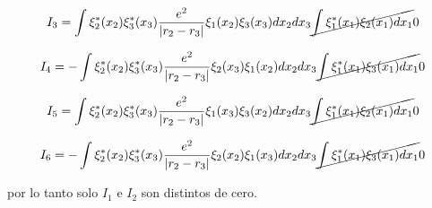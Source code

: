 \documentclass[12pt,a4paper]{article}
\begin{document}
\begin{enumerate}
\begin{enumerate}
    
    
    \begin{equation*}
        I_3=\int \xi_{2}^{*}(x_2) \xi_{3}^{*}(x_3)\frac{e^2}{|r_2 -r_3|} \xi_1(x_2) \xi_3 (x_3)  dx_2 dx_3\cancel{ \int \xi_{1}^{*}(x_1)\xi_2 (x_1) dx_1}0
    \end{equation*}
    
    
    \begin{equation*}
        I_4=-\int \xi_{2}^{*}(x_2) \xi_{3}^{*}(x_3)\frac{e^2}{|r_2 -r_3|} \xi_2(x_3) \xi_1 (x_2)  dx_2 dx_3 \cancel{\int \xi_{1}^{*}(x_1)\xi_3 (x_1) dx_1}0
    \end{equation*}
    
    
    
    \begin{equation*}
        I_5=\int \xi_{2}^{*}(x_2) \xi_{3}^{*}(x_3)\frac{e^2}{|r_2 -r_3|} \xi_1(x_3) \xi_3 (x_2)  dx_2 dx_3 \cancel{\int \xi_{1}^{*}(x_1)\xi_2 (x_1) dx_1}0
    \end{equation*}
    
    
    \begin{equation*}
        I_6 =-\int \xi_{2}^{*}(x_2) \xi_{3}^{*}(x_3)\frac{e^2}{|r_2 -r_3|} \xi_2(x_2) \xi_1 (x_3)  dx_2 dx_3 \cancel{\int \xi_{1}^{*}(x_1)\xi_3 (x_1) dx_1}0
    \end{equation*}
    
    por lo tanto solo $I_1$ e $I_2$ son distintos de cero.
    
    
    
    
    
    
    
    
    
\end{enumerate}

    
    
\end{enumerate}
\end{document}
